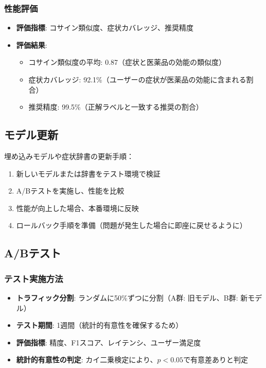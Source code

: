 \documentclass[a4paper,11pt,ja=standard,xelatex]{bxjsarticle}
\theoremstyle{definition}
\begin{document}
\subsubsection{性能評価}

\begin{itemize}
\item \textbf{評価指標}: コサイン類似度、症状カバレッジ、推奨精度
\item \textbf{評価結果}: 
  \begin{itemize}
  \item コサイン類似度の平均: 0.87（症状と医薬品の効能の類似度）
  \item 症状カバレッジ: 92.1\%（ユーザーの症状が医薬品の効能に含まれる割合）
  \item 推奨精度: 99.5\%（正解ラベルと一致する推奨の割合）
  \end{itemize}
\end{itemize}

\subsection{モデル更新}

埋め込みモデルや症状辞書の更新手順：
\begin{enumerate}
\item 新しいモデルまたは辞書をテスト環境で検証
\item A/Bテストを実施し、性能を比較
\item 性能が向上した場合、本番環境に反映
\item ロールバック手順を準備（問題が発生した場合に即座に戻せるように）
\end{enumerate}

\subsection{A/Bテスト}

\subsubsection{テスト実施方法}

\begin{itemize}
\item \textbf{トラフィック分割}: ランダムに50\%ずつに分割（A群: 旧モデル、B群: 新モデル）
\item \textbf{テスト期間}: 1週間（統計的有意性を確保するため）
\item \textbf{評価指標}: 精度、F1スコア、レイテンシ、ユーザー満足度
\item \textbf{統計的有意性の判定}: カイ二乗検定により、$p < 0.05$で有意差ありと判定
\end{itemize}
\end{document}
